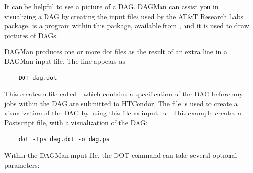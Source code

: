 It can be helpful to see a picture of a DAG.
DAGMan can assist you in visualizing a DAG by creating
the input files used by the AT\&T Research Labs 
 package. 
 is a program within this package,
available from ,
and it is used to draw pictures of DAGs. 

DAGMan produces one or more dot files as the result of
an extra line
in a DAGMan input file. 
The line appears as
\begin{verbatim}
    DOT dag.dot
\end{verbatim}

This creates a file called .
which contains
a specification of the DAG before any jobs within the DAG
are submitted to HTCondor.
The  file is used to create a visualization
of the DAG by using this file as input to .
This example creates a Postscript file, with a visualization of the DAG:

\begin{verbatim}
    dot -Tps dag.dot -o dag.ps
\end{verbatim}

Within the DAGMan input file,
the DOT command can take several optional parameters:

